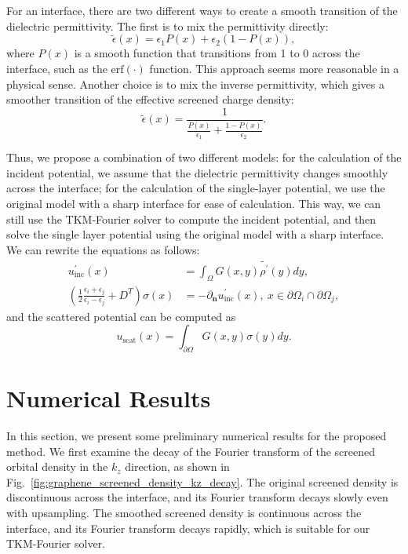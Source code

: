 \documentclass[prb,amsmath,amssymb, 10pt]{revtex4}
\begin{document}
For an interface, there are two different ways to create a smooth transition of the dielectric permittivity.
The first is to mix the permittivity directly:
\begin{equation}
    \tilde{\epsilon}(x) = \epsilon_1 P(x) + \epsilon_2 (1 - P(x)),
\end{equation}
where $P(x)$ is a smooth function that transitions from 1 to 0 across the interface, such as the $\text{erf}(\cdot)$ function.
This approach seems more reasonable in a physical sense.
Another choice is to mix the inverse permittivity, which gives a smoother transition of the effective screened charge density:
\begin{equation}
    \tilde{\epsilon}(x) = \frac{1}{\frac{P(x)}{\epsilon_1} + \frac{1 - P(x)}{\epsilon_2}}.
\end{equation}

Thus, we propose a combination of two different models: for the calculation of the incident potential, we assume that the dielectric permittivity changes smoothly across the interface; for the calculation of the single-layer potential, we use the original model with a sharp interface for ease of calculation.
This way, we can still use the TKM-Fourier solver to compute the incident potential, and then solve the single layer potential using the original model with a sharp interface.
We can rewrite the equations as follows:
\begin{align}
    u_{\text{inc}}^\prime(x) &= \int_{\Omega} G(x,y) \tilde{\rho^\prime}(y) dy, \\
    \left( \frac{1}{2} \frac{\epsilon_i + \epsilon_j}{\epsilon_i - \epsilon_j} + D^T \right) \sigma(x) &= - \partial_{\mathbf{n}} u_{\text{inc}}^\prime(x),~x \in \partial \Omega_i \cap \partial \Omega_j,
\end{align}
and the scattered potential can be computed as
\begin{equation}
    u_{\text{scat}}(x) = \int_{\partial \Omega} G(x,y) \sigma(y) dy.
\end{equation}

\section{Numerical Results}

In this section, we present some preliminary numerical results for the proposed method.
We first examine the decay of the Fourier transform of the screened orbital density in the $k_z$ direction, as shown in Fig.~\ref{fig:graphene_screened_density_kz_decay}.
The original screened density is discontinuous across the interface, and its Fourier transform decays slowly even with upsampling.
The smoothed screened density is continuous across the interface, and its Fourier transform decays rapidly, which is suitable for our TKM-Fourier solver.
\end{document}
